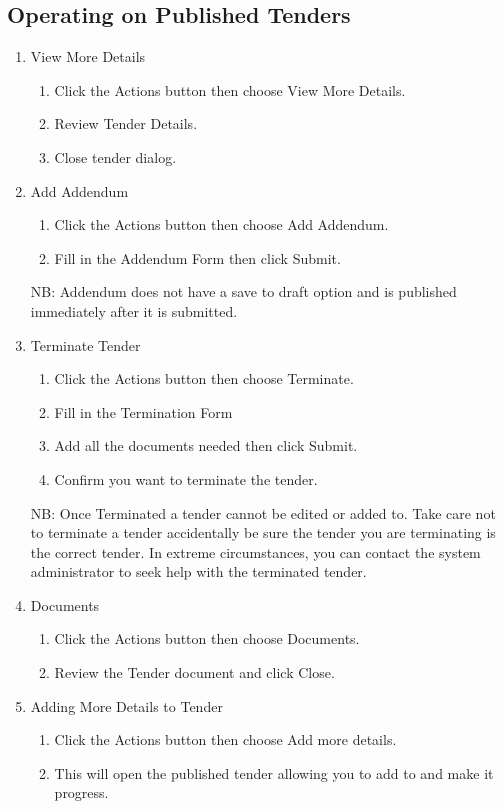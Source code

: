 \documentclass [12pt]{book}
\begin{document}
\subsection{Operating on Published Tenders}
\begin{enumerate} 
\item	View More Details
    \begin{enumerate}
    \item	Click the Actions button then choose View More Details.
    \item	Review Tender Details.
    \item	Close tender dialog.
    \end{enumerate}

\item	Add Addendum
    \begin{enumerate}
    \item	Click the Actions button then choose Add Addendum.
    \item	Fill in the Addendum Form then click Submit.
    \end{enumerate}
    NB: Addendum does not have a save to draft option and is published immediately after it is submitted.


\item	Terminate Tender
    \begin{enumerate}
        \item	Click the Actions button then choose Terminate.
        \item	Fill in the Termination Form
        \item	Add all the documents needed then click Submit.
        \item	Confirm you want to terminate the tender.
    \end{enumerate}
    NB: Once Terminated a tender cannot be edited or added to.
    Take care not to terminate a tender accidentally be sure the tender you are terminating is the correct tender. In extreme circumstances, you can contact the system administrator to seek help with the terminated tender.

\item Documents 
    \begin{enumerate}
        \item	Click the Actions button then choose Documents.
        \item	Review the Tender document and click Close.
    \end{enumerate}

\item	Adding More Details to Tender
    \begin{enumerate}
        \item Click the Actions button then choose Add more details.
        \item This will open the published tender allowing you to add to and make it progress.
    \end{enumerate}
    

\end{enumerate}
\end{document}
